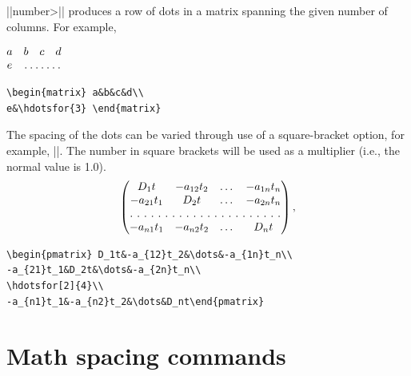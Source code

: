 \documentclass[leqno,titlepage,openany]{amsldoc}[1999/12/13]
\makeatletter
\let\oldcs\cs
\def\cs#1{\texorpdfstring{\oldcs{#1}}{\@backslashchar\@backslashchar#1}}
\let\cn\cs
\makeatother
\begin{document}
\cn{hdotsfor}|{|\<number>|}| produces a row of dots in a
matrix spanning the given number of
columns. For example,
\begin{center}
\begin{minipage}{.3\columnwidth}
\noindent$\begin{matrix} a&b&c&d\\
e&\hdotsfor{3} \end{matrix}$
\end{minipage}%
\qquad
\begin{minipage}{.45\columnwidth}
\begin{verbatim}
\begin{matrix} a&b&c&d\\
e&\hdotsfor{3} \end{matrix}
\end{verbatim}
\end{minipage}%
\end{center}

The spacing of the dots can be varied through use of a square-bracket
option,
for example, ||.  The number in square brackets
will be used as a multiplier (i.e., the normal value is 1.0).
\begin{equation}\label{eq:D}
\begin{pmatrix} D_1t&-a_{12}t_2&\dots&-a_{1n}t_n\\
-a_{21}t_1&D_2t&\dots&-a_{2n}t_n\\
\hdotsfor[2]{4}\\
-a_{n1}t_1&-a_{n2}t_2&\dots&D_nt\end{pmatrix},
\end{equation}
\begin{verbatim}
\begin{pmatrix} D_1t&-a_{12}t_2&\dots&-a_{1n}t_n\\
-a_{21}t_1&D_2t&\dots&-a_{2n}t_n\\
\hdotsfor[2]{4}\\
-a_{n1}t_1&-a_{n2}t_2&\dots&D_nt\end{pmatrix}
\end{verbatim}


\section{Math spacing commands}
\end{document}
